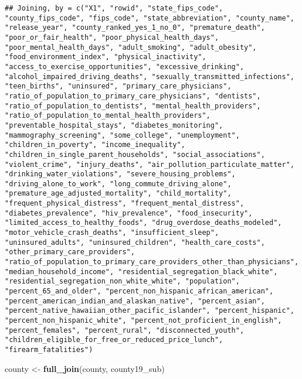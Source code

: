 \documentclass[
]{article}
\newenvironment{Shaded}{\begin{snugshade}}{\end{snugshade}}
\newcommand{\KeywordTok}[1]{\textcolor[rgb]{0.13,0.29,0.53}{\textbf{#1}}}
\newcommand{\NormalTok}[1]{#1}
\newcommand{\StringTok}[1]{\textcolor[rgb]{0.31,0.60,0.02}{#1}}
\begin{document}
\begin{verbatim}
## Joining, by = c("X1", "rowid", "state_fips_code", "county_fips_code", "fips_code", "state_abbreviation", "county_name", "release_year", "county_ranked_yes_1_no_0", "premature_death", "poor_or_fair_health", "poor_physical_health_days", "poor_mental_health_days", "adult_smoking", "adult_obesity", "food_environment_index", "physical_inactivity", "access_to_exercise_opportunities", "excessive_drinking", "alcohol_impaired_driving_deaths", "sexually_transmitted_infections", "teen_births", "uninsured", "primary_care_physicians", "ratio_of_population_to_primary_care_physicians", "dentists", "ratio_of_population_to_dentists", "mental_health_providers", "ratio_of_population_to_mental_health_providers", "preventable_hospital_stays", "diabetes_monitoring", "mammography_screening", "some_college", "unemployment", "children_in_poverty", "income_inequality", "children_in_single_parent_households", "social_associations", "violent_crime", "injury_deaths", "air_pollution_particulate_matter", "drinking_water_violations", "severe_housing_problems", "driving_alone_to_work", "long_commute_driving_alone", "premature_age_adjusted_mortality", "child_mortality", "frequent_physical_distress", "frequent_mental_distress", "diabetes_prevalence", "hiv_prevalence", "food_insecurity", "limited_access_to_healthy_foods", "drug_overdose_deaths_modeled", "motor_vehicle_crash_deaths", "insufficient_sleep", "uninsured_adults", "uninsured_children", "health_care_costs", "other_primary_care_providers", "ratio_of_population_to_primary_care_providers_other_than_physicians", "median_household_income", "residential_segregation_black_white", "residential_segregation_non_white_white", "population", "percent_65_and_older", "percent_non_hispanic_african_american", "percent_american_indian_and_alaskan_native", "percent_asian", "percent_native_hawaiian_other_pacific_islander", "percent_hispanic", "percent_non_hispanic_white", "percent_not_proficient_in_english", "percent_females", "percent_rural", "disconnected_youth", "children_eligible_for_free_or_reduced_price_lunch", "firearm_fatalities")
\end{verbatim}

\begin{Shaded}
\begin{Highlighting}[]
\NormalTok{county <-}\StringTok{ }\KeywordTok{full_join}\NormalTok{(county, county19_sub)}
\end{Highlighting}
\end{Shaded}
\end{document}
